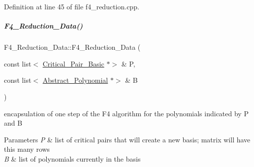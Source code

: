Definition at line 45 of file f4\+\_\+reduction.\+cpp.

\mbox{\label{group___g_b_computation_ada9c61c0f75be4a2b3dd5c762c1c9a1b}} 
\subparagraph{\texorpdfstring{F4\+\_\+\+Reduction\+\_\+\+Data()}{F4\_Reduction\_Data()}\hspace{0.1cm}{\footnotesize\ttfamily [3/3]}}
{\footnotesize\ttfamily F4\+\_\+\+Reduction\+\_\+\+Data\+::\+F4\+\_\+\+Reduction\+\_\+\+Data (\begin{DoxyParamCaption}\item[{const list$<$ \hyperlink{group___g_b_computation_class_critical___pair___basic}{Critical\+\_\+\+Pair\+\_\+\+Basic} $\ast$$>$ \&}]{P,  }\item[{const list$<$ \hyperlink{group__polygroup_class_abstract___polynomial}{Abstract\+\_\+\+Polynomial} $\ast$$>$ \&}]{B }\end{DoxyParamCaption})}



encapsulation of one step of the F4 algorithm for the polynomials indicated by {\ttfamily P} and {\ttfamily B} 


\begin{DoxyParams}{Parameters}
{\em P} & list of critical pairs that will create a new basis; matrix will have this many rows \\
\hline
{\em B} & list of polynomials currently in the basis \\
\hline
\end{DoxyParams}


